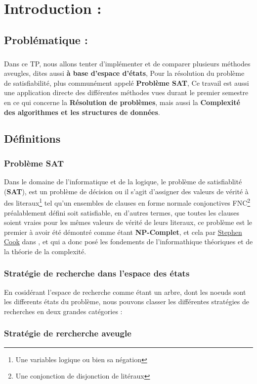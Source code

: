 \chapter{Introduction : }
\section{Problématique : }
\paragraph{}
Dans ce TP, nous allons tenter d'implémenter et de comparer plusieurs méthodes aveugles, dites aussi \textbf{à base d'espace d'états}, Pour la résolution du problème de satisfiabilité, plus communément appelé \textbf{Problème SAT}, Ce travail est aussi une application directe des différentes méthodes vues durant le premier semestre en ce qui concerne la \textbf{Résolution de problèmes}, mais aussi la \textbf{Complexité des algorithmes et les structures de données}.
\section{Définitions}
\subsection{Problème SAT}
Dans le domaine de l'informatique et de la logique, le problème de satisfiablité (\textbf{SAT}), est un problème de décision ou il s'agit d'assigner des valeurs de vérité à des literaux\footnote{Une variables logique ou bien sa négation} tel qu'un ensembles de clauses en forme normale conjonctives FNC\footnote{Une conjonction de disjonction de litéraux} préalablement défini soit satisfiable, en d'autres termes, que toutes les clauses soient vraies pour les mêmes valeurs de vérité de leurs literaux, ce problème est le premier à avoir été démontré comme étant \textbf{NP-Complet}, et cela par \href{https://en.wikipedia.org/wiki/Stephen_Cook}{Stephen Cook} dans \cite{cook}, et qui a donc posé les fondements de l'informathique théoriques et de la théorie de la complexité.
\newpage
\subsection{Stratégie de recherche dans l'espace des états}
En cosidérant l'espace de recherche comme étant un arbre, dont les noeuds sont les differents états du problème, nous pouvons classer les différentes stratégies de recherches en deux grandes catégories :
\subsection
{Stratégie de rercherche aveugle}

